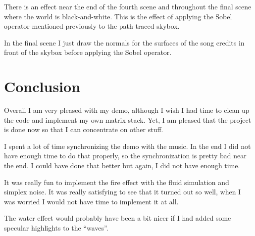 \documentclass{acmsiggraph}               %
\begin{document}
There is an effect near the end of the fourth scene and throughout the final
scene where the world is black-and-white. This is the effect of applying the
Sobel operator mentioned previously to the path traced skybox.

In the final scene I just draw the normals for the surfaces of the song credits
in front of the skybox before applying the Sobel operator.

\section{Conclusion}

Overall I am very pleased with my demo, although I wish I had time to clean up
the code and implement my own matrix stack. Yet, I am pleased that the project
is done now so that I can concentrate on other stuff.

I spent a lot of time synchronizing the demo with the music. In the end I did
not have enough time to do that properly, so the synchronization is pretty
bad near the end. I could have done that better but again, I did not have
enough time.

It was really fun to implement the fire effect with the fluid simulation and
simplex noise. It was really satisfying to see that it turned out so well,
when I was worried I would not have time to implement it at all.

The water effect would probably have been a bit nicer if I had added some
specular highlights to the ``waves''.



\end{document}
